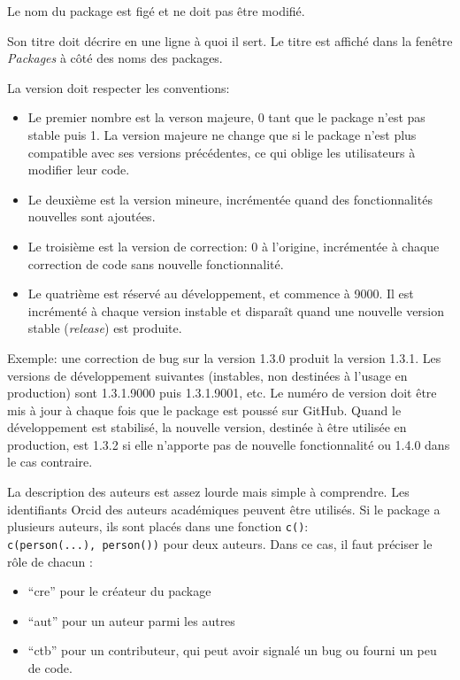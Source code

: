 \documentclass[
  11pt,
  french,
  a4paper,
  extrafontsizes,onecolumn,openright
  ]{memoir}
\providecommand{\tightlist}{%
  \setlength{\itemsep}{0pt}\setlength{\parskip}{0pt}}
\begin{document}
Le nom du package est figé et ne doit pas être modifié.

Son titre doit décrire en une ligne à quoi il sert.
Le titre est affiché dans la fenêtre \emph{Packages} à côté des noms des packages.

La version doit respecter les conventions:

\begin{itemize}
\tightlist
\item
  Le premier nombre est la verson majeure, 0 tant que le package n'est pas stable puis 1.
  La version majeure ne change que si le package n'est plus compatible avec ses versions précédentes, ce qui oblige les utilisateurs à modifier leur code.
\item
  Le deuxième est la version mineure, incrémentée quand des fonctionnalités nouvelles sont ajoutées.
\item
  Le troisième est la version de correction: 0 à l'origine, incrémentée à chaque correction de code sans nouvelle fonctionnalité.
\item
  Le quatrième est réservé au développement, et commence à 9000.
  Il est incrémenté à chaque version instable et disparaît quand une nouvelle version stable (\emph{release}) est produite.
\end{itemize}

Exemple: une correction de bug sur la version 1.3.0 produit la version 1.3.1.
Les versions de développement suivantes (instables, non destinées à l'usage en production) sont 1.3.1.9000 puis 1.3.1.9001, etc.
Le numéro de version doit être mis à jour à chaque fois que le package est poussé sur GitHub.
Quand le développement est stabilisé, la nouvelle version, destinée à être utilisée en production, est 1.3.2 si elle n'apporte pas de nouvelle fonctionnalité ou 1.4.0 dans le cas contraire.

La description des auteurs est assez lourde mais simple à comprendre.
Les identifiants Orcid des auteurs académiques peuvent être utilisés.
Si le package a plusieurs auteurs, ils sont placés dans une fonction \texttt{c()}: \texttt{c(person(...),\ person())} pour deux auteurs.
Dans ce cas, il faut préciser le rôle de chacun :

\begin{itemize}
\tightlist
\item
  ``cre'' pour le créateur du package
\item
  ``aut'' pour un auteur parmi les autres
\item
  ``ctb'' pour un contributeur, qui peut avoir signalé un bug ou fourni un peu de code.
\end{itemize}
\end{document}
